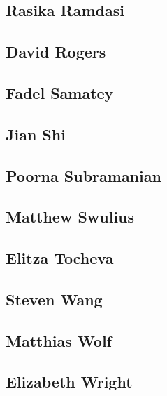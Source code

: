 \documentclass[]{tufte-book}
\begin{document}
\hypertarget{rasika_ramdasi}{\subsection{Rasika
Ramdasi}\label{rasika_ramdasi}}

\hypertarget{david_rogers}{\subsection{David
Rogers}\label{david_rogers}}

\hypertarget{fadel_samatey}{\subsection{Fadel
Samatey}\label{fadel_samatey}}

\hypertarget{jian_shi}{\subsection{Jian Shi}\label{jian_shi}}

\hypertarget{poorna_subramanian}{\subsection{Poorna
Subramanian}\label{poorna_subramanian}}

\hypertarget{matthew_swulius}{\subsection{Matthew
Swulius}\label{matthew_swulius}}

\hypertarget{elitza_tocheva}{\subsection{Elitza
Tocheva}\label{elitza_tocheva}}

\hypertarget{steven_wang}{\subsection{Steven Wang}\label{steven_wang}}

\subsection{Matthias Wolf}\label{matthias_wolf}

\hypertarget{elizabeth_wright}{\subsection{Elizabeth
Wright}\label{elizabeth_wright}}
\end{document}
